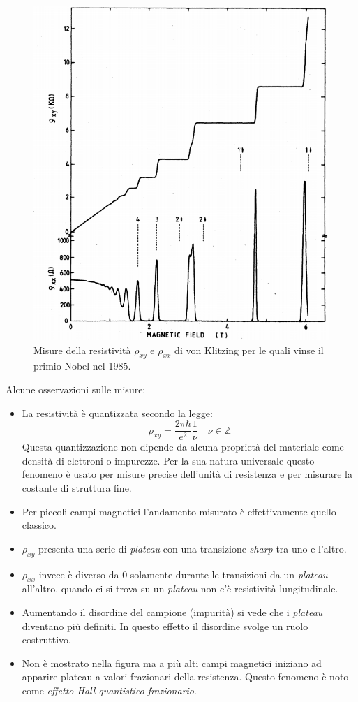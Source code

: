 \documentclass[12pt,a4paper]{article}
\begin{document}
\begin{figure}[!htb]
\centering
\includegraphics[scale=0.4]{immagini/integer.png}
\caption{Misure della resistività $\rho_{xy}$ e $\rho_{xx}$ di von Klitzing per le quali vinse il primio Nobel nel 1985.\label{von}}
\end{figure}

Alcune osservazioni sulle misure:

\begin{itemize}
\item La resistività è quantizzata secondo la legge: \[ \rho_{xy} = \frac{2 \pi  \hbar}{e^2} \frac{1}{\nu} \quad \nu \in \mathbb{Z} \] Questa quantizzazione non dipende da alcuna proprietà del materiale come densità di elettroni o impurezze. Per la sua natura universale questo fenomeno è usato per misure precise dell'unità di resistenza e per misurare la costante di struttura fine. 
\item Per piccoli campi magnetici l'andamento misurato è effettivamente quello classico.
\item $\rho_{xy}$ presenta una serie di \emph{plateau} con una transizione \emph{sharp} tra uno e l'altro. 
\item $\rho_{xx}$ invece è diverso da $0$ solamente durante le transizioni da un \emph{plateau} all'altro. quando ci si trova su un \emph{plateau} non c'è resistività lungitudinale.
\item Aumentando il disordine del campione (impurità) si vede che i \emph{plateau} diventano più definiti. In questo effetto il disordine svolge un ruolo costruttivo.

\item Non è mostrato nella figura ma a più alti campi magnetici iniziano ad apparire plateau a valori frazionari della resistenza. Questo fenomeno è noto come \textit{effetto Hall quantistico frazionario}.
\end{itemize}
\end{document}
